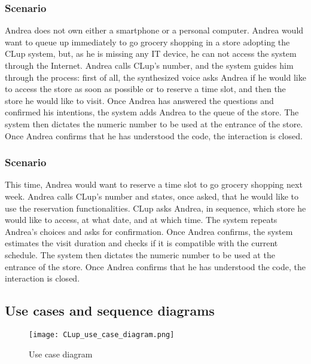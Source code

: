 \documentclass[../../main.tex]{subfiles}
\begin{document}
      \subsubsection{Scenario }

        Andrea does not own either a smartphone or a personal computer. 
        Andrea would want to queue up immediately to go grocery shopping in a store adopting the CLup system, 
        but, as he is missing any IT device, he can not access the system through the Internet. 
        Andrea calls CLup's number, and the system guides him through the process: first of all, 
        the synthesized voice asks Andrea if he would like to access the store as soon as possible or to reserve a time slot, 
        and then the store he would like to visit. Once Andrea has answered the questions and confirmed his intentions, 
        the system adds Andrea to the queue of the store. The system then dictates the numeric number to be used at the entrance of the store. 
        Once Andrea confirms that he has understood the code, the interaction is closed.



      \subsubsection{Scenario }

        This time, Andrea would want to reserve a time slot to go grocery shopping next week. 
        Andrea calls CLup's number and states, once asked, that he would like to use the reservation functionalities. 
        CLup asks Andrea, in sequence, which store he would like to access, at what date, and at which time. 
        The system repeats Andrea's choices and asks for confirmation. Once Andrea confirms, 
        the system estimates the visit duration and checks if it is compatible with the current schedule. 
        The system then dictates the numeric number to be used at the entrance of the store. 
        Once Andrea confirms that he has understood the code, the interaction is closed.


    \subsection{Use cases and sequence diagrams}

      \begin{figure}[H]
        \centering
        \texttt{[image: CLup\_use\_case\_diagram.png]}
        \caption{Use case diagram}
      \end{figure}
\end{document}
